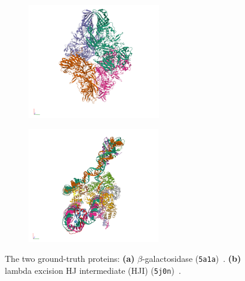\begin{figure}[ht!]
    \centering
    \begin{subfigure}[b]{0.45\textwidth}
        \includegraphics[height=5cm]{figures/5a1a_pdb.png}
        \caption{}
    \end{subfigure}
    \begin{subfigure}[b]{0.5\textwidth}
    \centering
        \includegraphics[height=5cm]{figures/5j0n_pdb.png}
        \caption{}
    \end{subfigure}
    \caption{%
        The two ground-truth proteins:
        \textbf{(a)} $\beta$-galactosidase (\texttt{5a1a})~\cite{5a1a_pdb}.
        \textbf{(b)} lambda excision HJ intermediate (HJI) (\texttt{5j0n})~\cite{5j0n_pdb}.
    }\label{fig:pdb-proteins}
\end{figure}


